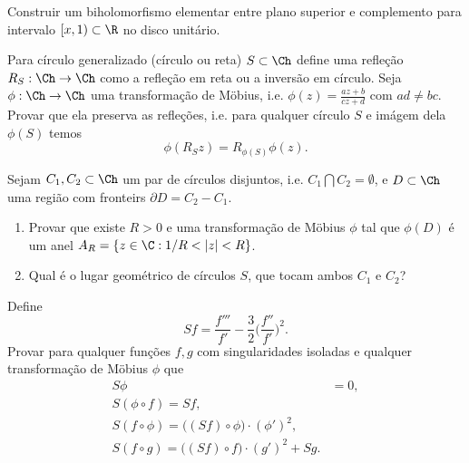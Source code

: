 \begin{problema}
Construir um biholomorfismo elementar entre
plano superior e complemento para intervalo $[x,1) \subset \R$
no disco unitário.
\end{problema}

\begin{problema}
Para círculo generalizado (círculo ou reta) $S \subset \Ch$ define uma refleção
$R_S : \Ch \to \Ch$ como a refleção em reta ou a inversão em círculo.
Seja $\phi: \Ch \to \Ch$ uma transformação de Möbius, i.e. $\phi(z) = \frac{az+b}{cz+d}$
com $ad\neq bc$. Provar que ela preserva as refleções, i.e. para qualquer
círculo $S$ e imágem dela $\phi(S)$ temos
\[ \phi(R_S z) = R_{\phi(S)} \phi(z) . \]
\end{problema}

\begin{problema}
Sejam $C_1,C_2 \subset \Ch$ um par de círculos disjuntos, i.e. $C_1 \bigcap C_2 = \emptyset$,
e $D \subset \Ch$ uma região com fronteirs $\partial D = C_2 - C_1$.
\begin{enumerate}
\item Provar que existe $R>0$ e uma transformação de Möbius $\phi$ tal que
$\phi(D)$ é um anel $A_R = \{ z\in\C: 1/R < |z| < R \}$.
\item Qual é o lugar geométrico de círculos $S$, que tocam ambos $C_1$ e $C_2$?
\end{enumerate}
\end{problema}

\begin{problema}
Define
\[ Sf = \frac{f'''}{f'} - \frac{3}{2} \big(\frac{f''}{f'}\big)^2 .\]
Provar para qualquer funções $f,g$ com singularidades isoladas e qualquer
transformação de Möbius $\phi$ que
\begin{align}
S \phi &= 0, \\
S (\phi \circ f) = S f,\\
S(f \circ \phi) = \big((Sf)\circ\phi\big) \cdot (\phi')^2, \\
S(f\circ g) = \big((Sf)\circ f\big) \cdot (g')^2 + Sg.
\end{align}
\end{problema}
